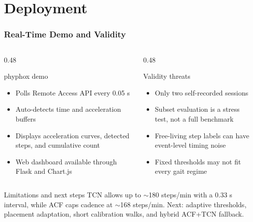 \section{Deployment}

\begin{frame}
    \frametitle{Real-Time Demo and Validity}
    \footnotesize
    \begin{columns}[t]
        \begin{column}{0.48\textwidth}
            \begin{block}{phyphox demo}
                \begin{itemize}
                    \item Polls Remote Access API every 0.05 s
                    \item Auto-detects time and acceleration buffers
                    \item Displays acceleration curves, detected steps, and cumulative count
                    \item Web dashboard available through Flask and Chart.js
                \end{itemize}
            \end{block}
        \end{column}
        \begin{column}{0.48\textwidth}
            \begin{exampleblock}{Validity threats}
                \begin{itemize}
                    \item Only two self-recorded sessions
                    \item Subset evaluation is a stress test, not a full benchmark
                    \item Free-living step labels can have event-level timing noise
                    \item Fixed thresholds may not fit every gait regime
                \end{itemize}
            \end{exampleblock}
        \end{column}
    \end{columns}

    \begin{alertblock}{Limitations and next steps}
        TCN allows up to $\sim$180 steps/min with a 0.33 s interval, while ACF caps cadence at $\sim$168 steps/min. Next: adaptive thresholds, placement adaptation, short calibration walks, and hybrid ACF+TCN fallback.
    \end{alertblock}
\end{frame}